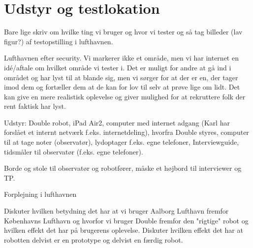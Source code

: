 \section{Udstyr og testlokation}
\label{UdstyrOgTestlokationValgAfGestikker}
%



Bare lige skriv om hvilke ting vi bruger og hvor vi tester og så tag billeder (lav figur?) af testopstilling i lufthavnen. 

Lufthavnen efter security. 
Vi markerer ikke et område, men vi har internet en idé/aftale om hvilket område vi tester i. Det er muligt for andre at gå ind i området og har lyst til at blande sig, men vi sørger for at der er en, der tager imod dem og fortæller dem at de kan for lov til selv at prøve lige om lidt. Det kan give en mere realistisk oplevelse og giver mulighed for at rekruttere folk der rent faktisk har lyst. 

Udstyr: Double robot, iPad Air2, computer med internet adgang (Karl har forslået et internt netværk f.eks. internetdeling), hvorfra Double styres, computer til at tage noter (observatør), lydoptager f.eks. egne telefoner, Interviewguide, tidsmåler til observatør (f.eks. egne telefoner). 

Borde og stole til observatør og robotfører, måske et højbord til interviewer og TP.   

Forplejning i lufthavnen


Diskuter hvilken betydning det har at vi bruger Aalborg Lufthavn fremfor Københavns Lufthavn og hvorfor vi bruger Double fremfor den "rigtige" robot og hvilken effekt det har på brugerens oplevelse. Diskuter hvilken effekt det har at robotten delvist er en prototype og delvist en færdig robot.          

